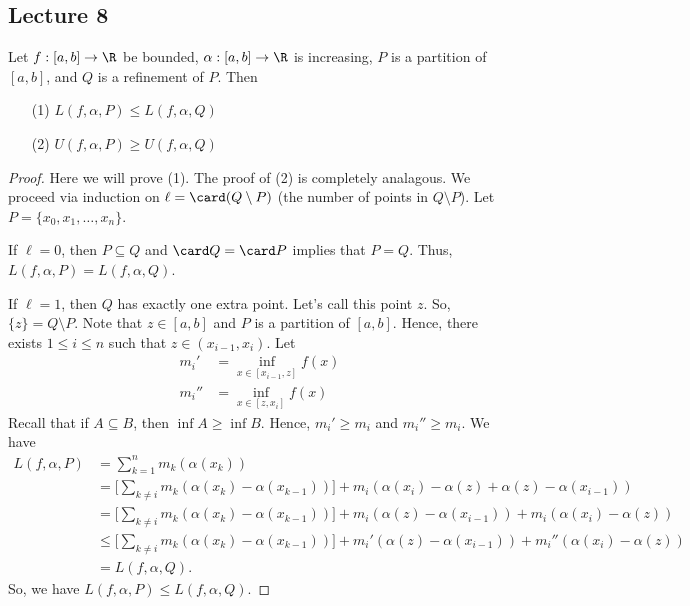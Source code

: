 \subsection{Lecture 8}

\begin{theorem}[Rudin 6.4]
    Let \( f: [a,b] \to \R  \) be bounded, \( \alpha : [a,b] \to \R  \) is increasing, \( P  \) is a partition of \( [a,b] \), and \( Q  \) is a refinement of \( P  \). Then
    \begin{enumerate}
        \item[(1)] \( L(f,\alpha,P) \leq L(f,\alpha, Q) \)
        \item[(2)] \( U(f,\alpha, P) \geq U(f,\alpha, Q ) \)
    \end{enumerate}
\end{theorem}
\begin{proof}
Here we will prove (1). The proof of (2) is completely analagous. We proceed via induction on \( \ell = \card (Q \setminus  P )  \) (the number of points in \( Q \setminus  P  \)). Let \( P = \{  {x}_{0}, {x}_{1}, \dots, {x}_{n} \}  \). 

If \( \ell = 0  \), then \( P \subseteq  Q   \) and \( \card Q = \card P  \) implies that \( P = Q  \). Thus, \( L(f,\alpha, P) = L(f,\alpha, Q ) \).

If \( \ell = 1  \), then \( Q  \) has exactly one extra point. Let's call this point \( z  \). So, \( \{ z  \}  = Q \setminus  P  \). Note that \( z \in [a,b] \) and \( P  \) is a partition of \( [a,b] \). Hence, there exists \( 1 \leq i \leq n  \) such that \( z \in ({x}_{i-1}, {x}_{i}) \). Let 
\begin{align*}
    {m}_{i}' &= \inf_{x \in [{x}_{i-1}, z]} f(x)  \\
    {m}_{i}'' &= \inf_{x \in [z,{x}_{i}]} f(x)
\end{align*}
Recall that if \( A \subseteq  B  \), then \( \inf A \geq \inf B  \). Hence, \( {m}_{i}' \geq {m}_{i} \) and \( {m}_{i}'' \geq {m}_{i} \).
We have 
\begin{align*}
    L(f,\alpha, P ) &= \sum_{ k=1  }^{ n } {m}_{k } (\alpha({x}_{k})) \\ 
                    &= \Big[ \sum_{ k \neq i  }^{  } {m}_{k } (\alpha({x}_{k}) - \alpha({x}_{k-1})) \Big] + {m}_{i} (\alpha({x}_{i}) - \alpha(z) + \alpha(z) - \alpha({x}_{i-1})) \\
                    &= \Big[ \sum_{ k \neq i  }^{  } {m}_{k } (\alpha({x}_{k}) - \alpha({x}_{k-1}))  \Big] +  {m}_{i}(\alpha(z) - \alpha({x}_{i-1})) + {m}_{i} (\alpha({x}_{i}) - \alpha(z) ) \\
                    &\leq \Big[\sum_{ k \neq i  }^{  } {m}_{k } (\alpha({x}_{k}) - \alpha({x}_{k-1})) \Big] + {m}_{i}' (\alpha(z) - \alpha({x}_{i-1})) + {m}_{i}''(\alpha({x}_{i}) - \alpha(z)) \\
                    &= L(f,\alpha, Q ).
\end{align*} 
So, we have \( L(f,\alpha,P) \leq L(f,\alpha,Q ) \).


\end{proof}
